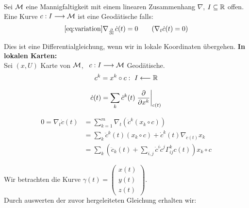 \begin{defs}[Geodätische]
Sei $\mathcal{M}$ eine Mannigfaltigkeit mit einem linearen Zusammenhang $\nabla$, $I \subseteq \mathbb{R}$ offen. Eine Kurve $c: I \longrightarrow \mathcal{M}$ ist eine Geodätische falls:
\begin{align*} 
\ref{eq:variation}
\nabla_{\frac{\partial}{\partial t}} \dot{c}(t) = 0 \qquad (\nabla_t \dot{c}(t) = 0)
\end{align*}
\end{defs}
Dies ist eine Differentialgleichung, wenn wir in lokale Koordinaten übergehen.
\textbf{In lokalen Karten:} \\
Sei $(x,U)$ Karte von $\mathcal{M}$, \ $c: I \longrightarrow \mathcal{M}$ Geodätische. 
\begin{align}
c^k = x^k \circ c: \ I \longleftarrow \mathbb{R}
\end{align}

\begin{align}
\dot{c}(t) = \sum_k \dot{c}^k(t) \eval{\frac{\partial}{\partial x^k}}_{c(t)}
\end{align}

\begin{align*}
0=\nabla_t\dot{c}(t) &= \sum_{k=1}^{m}\nabla_t(\dot{c}^k(x_k\circ c)) \\
							   &= \sum_k \ddot{c}^k(t)(x_k\circ c) + \dot{c}^k(t)\nabla_{\dot{c}(t)}x_k \\
							   &= \sum_k \left(\ddot{c}_k(t) + \sum_{i,j}\dot{c}^{i}\dot{c}^j \Gamma_{ij}^k c(t)\right) x_k \circ c
\end{align*}

Wir betrachten die Kurve $\gamma(t)= \begin{pmatrix}
x(t) \\ y(t) \\z(t) \end{pmatrix}$. \\

Durch auswerten der zuvor hergeleiteten Gleichung erhalten wir:




